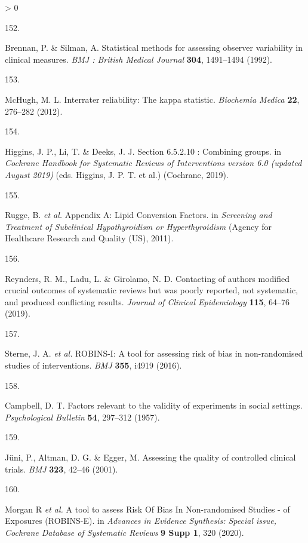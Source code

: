 \documentclass[a4paper, twoside]{templates/ociamthesis}
\newlength{\cslhangindent}
\newlength{\csllabelwidth}
\newenvironment{CSLReferences}[3] %
 {%
  \setlength{\parindent}{0pt}
  \ifodd #1 \everypar{\setlength{\hangindent}{\cslhangindent}}\ignorespaces\fi
  \ifnum #2 > 0
  \setlength{\parskip}{#2\baselineskip}
  \fi
 }%
 {}
\newcommand{\CSLLeftMargin}[1]{\parbox[t]{\maxof{\widthof{#1}}{\csllabelwidth}}{#1}}
\newcommand{\CSLRightInline}[1]{\parbox[t]{\linewidth - \csllabelwidth}{#1}}
\begin{document}
\begin{CSLReferences}{0}{0}
\leavevmode\hypertarget{ref-brennan1992}{}%
\CSLLeftMargin{152. }
\CSLRightInline{Brennan, P. \& Silman, A. Statistical methods for assessing observer variability in clinical measures. \emph{BMJ : British Medical Journal} \textbf{304}, 1491--1494 (1992).}

\leavevmode\hypertarget{ref-mchugh2012}{}%
\CSLLeftMargin{153. }
\CSLRightInline{McHugh, M. L. Interrater reliability: The kappa statistic. \emph{Biochemia Medica} \textbf{22}, 276--282 (2012).}

\leavevmode\hypertarget{ref-higgins2019}{}%
\CSLLeftMargin{154. }
\CSLRightInline{Higgins, J. P., Li, T. \& Deeks, J. J. Section 6.5.2.10 : Combining groups. in \emph{Cochrane {Handbook} for {Systematic Reviews} of {Interventions} version 6.0 (updated {August} 2019)} (eds. Higgins, J. P. T. et al.) ({Cochrane}, 2019).}

\leavevmode\hypertarget{ref-rugge2011}{}%
\CSLLeftMargin{155. }
\CSLRightInline{Rugge, B. \emph{et al.} Appendix {A}: Lipid {Conversion Factors}. in \emph{Screening and {Treatment} of {Subclinical Hypothyroidism} or {Hyperthyroidism}} ({Agency for Healthcare Research and Quality (US)}, 2011).}

\leavevmode\hypertarget{ref-reynders2019}{}%
\CSLLeftMargin{156. }
\CSLRightInline{Reynders, R. M., Ladu, L. \& Girolamo, N. D. Contacting of authors modified crucial outcomes of systematic reviews but was poorly reported, not systematic, and produced conflicting results. \emph{Journal of Clinical Epidemiology} \textbf{115}, 64--76 (2019).}

\leavevmode\hypertarget{ref-sterne2016}{}%
\CSLLeftMargin{157. }
\CSLRightInline{Sterne, J. A. \emph{et al.} {ROBINS}-{I}: A tool for assessing risk of bias in non-randomised studies of interventions. \emph{BMJ} \textbf{355}, i4919 (2016).}

\leavevmode\hypertarget{ref-campbell1957}{}%
\CSLLeftMargin{158. }
\CSLRightInline{Campbell, D. T. Factors relevant to the validity of experiments in social settings. \emph{Psychological Bulletin} \textbf{54}, 297--312 (1957).}

\leavevmode\hypertarget{ref-juni2001}{}%
\CSLLeftMargin{159. }
\CSLRightInline{Jüni, P., Altman, D. G. \& Egger, M. Assessing the quality of controlled clinical trials. \emph{BMJ} \textbf{323}, 42--46 (2001).}

\leavevmode\hypertarget{ref-morganr2020}{}%
\CSLLeftMargin{160. }
\CSLRightInline{Morgan R \emph{et al.} A tool to assess {Risk Of Bias In Non}-randomised {Studies} - of {Exposures} ({ROBINS}-{E}). in \emph{Advances in {Evidence Synthesis}: Special issue, {Cochrane Database} of {Systematic Reviews}} \textbf{9 Supp 1}, 320 (2020).}


\end{CSLReferences}
\end{document}
